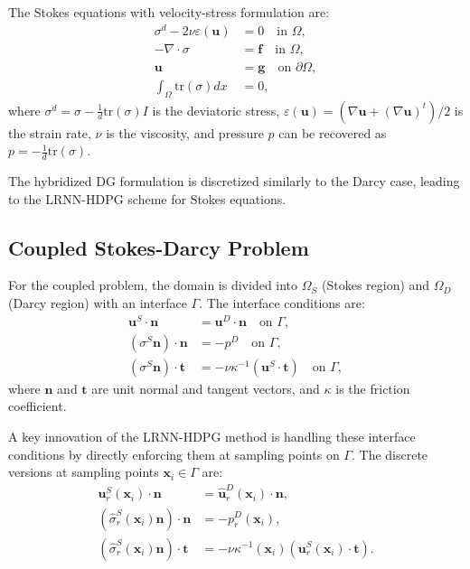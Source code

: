 \documentclass[11pt,a4paper]{article}
\begin{document}
The Stokes equations with velocity-stress formulation are:
\begin{align}
\sigma^d - 2\nu\varepsilon(\mathbf{u}) &= 0 \quad \text{in } \Omega, \\
-\nabla \cdot \sigma &= \mathbf{f} \quad \text{in } \Omega, \\
\mathbf{u} &= \mathbf{g} \quad \text{on } \partial\Omega, \\
\int_\Omega \text{tr}(\sigma) dx &= 0,
\end{align}
where $\sigma^d = \sigma - \frac{1}{d}\text{tr}(\sigma)I$ is the deviatoric stress, $\varepsilon(\mathbf{u}) = (\nabla \mathbf{u} + (\nabla \mathbf{u})^t)/2$ is the strain rate, $\nu$ is the viscosity, and pressure $p$ can be recovered as $p = -\frac{1}{d}\text{tr}(\sigma)$.

The hybridized DG formulation is discretized similarly to the Darcy case, leading to the LRNN-HDPG scheme for Stokes equations.

\subsection{Coupled Stokes-Darcy Problem}

For the coupled problem, the domain is divided into $\Omega_S$ (Stokes region) and $\Omega_D$ (Darcy region) with an interface $\Gamma$. The interface conditions are:
\begin{align}
\mathbf{u}^S \cdot \mathbf{n} &= \mathbf{u}^D \cdot \mathbf{n} \quad \text{on } \Gamma, \\
(\sigma^S\mathbf{n}) \cdot \mathbf{n} &= -p^D \quad \text{on } \Gamma, \\
(\sigma^S\mathbf{n}) \cdot \mathbf{t} &= -\nu\kappa^{-1}(\mathbf{u}^S \cdot \mathbf{t}) \quad \text{on } \Gamma,
\end{align}
where $\mathbf{n}$ and $\mathbf{t}$ are unit normal and tangent vectors, and $\kappa$ is the friction coefficient.

A key innovation of the LRNN-HDPG method is handling these interface conditions by directly enforcing them at sampling points on $\Gamma$. The discrete versions at sampling points $\mathbf{x}_i \in \Gamma$ are:
\begin{align}
\mathbf{u}^S_r(\mathbf{x}_i) \cdot \mathbf{n} &= \hat{\mathbf{u}}^D_r(\mathbf{x}_i) \cdot \mathbf{n}, \\
(\hat{\sigma}^S_r(\mathbf{x}_i)\mathbf{n}) \cdot \mathbf{n} &= -p^D_r(\mathbf{x}_i), \\
(\hat{\sigma}^S_r(\mathbf{x}_i)\mathbf{n}) \cdot \mathbf{t} &= -\nu\kappa^{-1}(\mathbf{x}_i)(\mathbf{u}^S_r(\mathbf{x}_i) \cdot \mathbf{t}).
\end{align}
\end{document}
